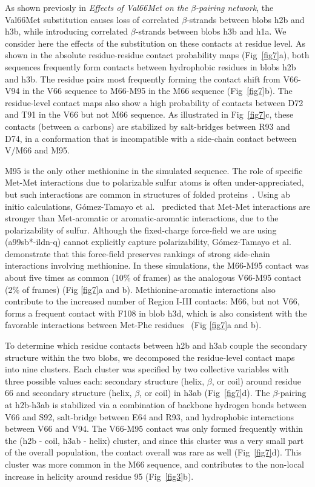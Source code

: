 \documentclass[10pt,letterpaper]{article}
\begin{document}
As shown previosly in {\it Effects of Val66Met on the $\beta$-pairing network}, the Val66Met substitution causes loss of correlated $\beta$-strands between blobs h2b and h3b, while introducing correlated $\beta$-strands between blobs h3b and h1a. We consider here the effects of the substitution on these contacts at residue level. As shown in the absolute residue-residue contact probability maps (Fig~\ref{fig7}a), both sequences frequently form contacts between hydrophobic residues in blobs h2b and h3b. The residue pairs most frequently forming the contact shift from V66-V94 in the V66 sequence to M66-M95 in the M66 sequence (Fig~\ref{fig7}b). 
The residue-level contact maps also show a high probability of contacts between D72 and T91 in the V66 but not M66 sequence. As illustrated in Fig~\ref{fig7}c, these contacts (between $\alpha$ carbons) are stabilized by salt-bridges between R93 and D74, in a conformation that is incompatible with a side-chain contact between V/M66 and M95. 

M95 is the only other methionine in the simulated sequence. The role of specific Met-Met interactions due to polarizable sulfur atoms is often under-appreciated, but such interactions are common in structures of folded proteins~\cite{Faure2008}. Using ab initio calculations, G\'omez-Tamayo et al.~\cite{Gomez-Tamayo2016} predicted that Met-Met interactions are stronger than Met-aromatic or aromatic-aromatic interactions, due to the polarizability of sulfur. Although the fixed-charge force-field we are using (a99sb*-ildn-q) cannot explicitly capture polarizability, G\'omez-Tamayo et al. demonstrate that this force-field preserves rankings of strong side-chain interactions involving methionine. In these simulations, the M66-M95 contact was about five times as common (10\% of frames) as the analogous V66-M95 contact (2\% of frames) (Fig \ref{fig7}a and b). Methionine-aromatic interactions also contribute to the increased number of Region I-III contacts: M66, but not V66, forms a frequent contact with F108 in blob h3d, which is also consistent with the favorable interactions between Met-Phe residues~\cite{Viguera1995,Faure2008,Valley2012} (Fig \ref{fig7}a and b). 

To determine which residue contacts between h2b and h3ab couple the secondary structure within the two blobs, we decomposed the residue-level contact maps into nine clusters. Each cluster was specified by two collective variables with three possible values each: secondary structure (helix, $\beta$, or coil) around residue 66 and secondary structure (helix, $\beta$, or coil) in h3ab (Fig~\ref{fig7}d). The $\beta$-pairing at h2b-h3ab is stabilized via a combination of backbone hydrogen bonds between V66 and S92, salt-bridge between E64 and R93, and hydrophobic interactions between V66 and V94. The V66-M95 contact was only formed frequently within the (h2b - coil, h3ab - helix) cluster, and since this cluster was a very small part of the overall population, the contact overall was rare as well (Fig~\ref{fig7}d). This cluster was more common in the M66 sequence, and contributes to the non-local increase in helicity around residue 95 (Fig~\ref{fig3}b).
\end{document}
